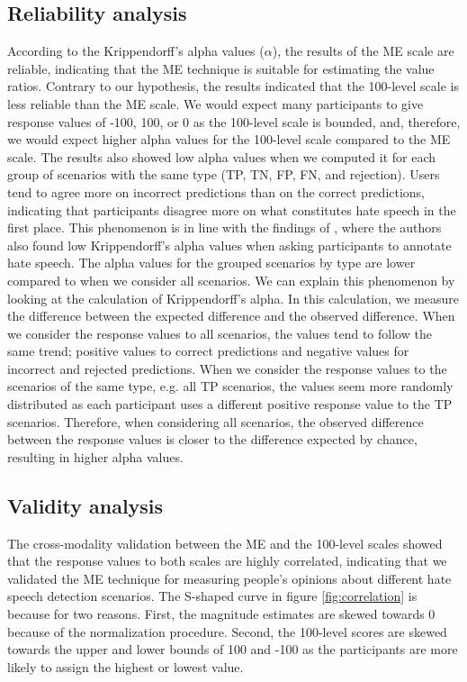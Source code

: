\subsection{Reliability analysis}
\label{sec:discussion-reliability}
%
According to the Krippendorff's alpha values ($\alpha$), the results of the ME scale are reliable, indicating that the ME technique is suitable for estimating the value ratios.
%
Contrary to our hypothesis, the results indicated that the 100-level scale is less reliable than the ME scale.
%
We would expect many participants to give response values of -100, 100, or 0 as the 100-level scale is bounded, and, therefore, we would expect higher alpha values for the 100-level scale compared to the ME scale.
%
The results also showed low alpha values when we computed it for each group of scenarios with the same type (TP, TN, FP, FN, and rejection).
%
Users tend to agree more on incorrect predictions than on the correct predictions, indicating that participants disagree more on what constitutes hate speech in the first place.
%
This phenomenon is in line with the findings of \citet{ross2017measuring}, where the authors also found low Krippendorff's alpha values when asking participants to annotate hate speech.
%
The alpha values for the grouped scenarios by type are lower compared to when we consider all scenarios.
%
We can explain this phenomenon by looking at the calculation of Krippendorff's alpha.
%
In this calculation, we measure the difference between the expected difference and the observed difference.
%
When we consider the response values to all scenarios, the values tend to follow the same trend; positive values to correct predictions and negative values for incorrect and rejected predictions.
%
When we consider the response values to the scenarios of the same type, e.g. all TP scenarios, the values seem more randomly distributed as each participant uses a different positive response value to the TP scenarios.
%
Therefore, when considering all scenarios, the observed difference between the response values is closer to the difference expected by chance, resulting in higher alpha values.
%

%
\subsection{Validity analysis}
\label{sec:discussion-validity}
The cross-modality validation between the ME and the 100-level scales showed that the response values to both scales are highly correlated, indicating that we validated the ME technique for measuring people's opinions about different hate speech detection scenarios.
%
The S-shaped curve in figure \ref{fig:correlation} is because for two reasons.
%
First, the magnitude estimates are skewed towards 0 because of the normalization procedure.
%
Second, the 100-level scores are skewed towards the upper and lower bounds of 100 and -100 as the participants are more likely to assign the highest or lowest value.

